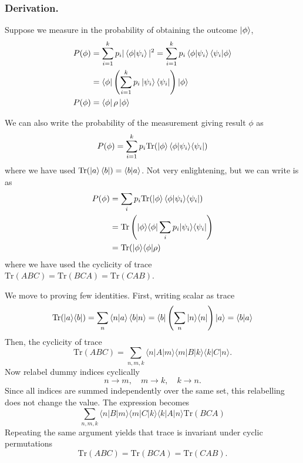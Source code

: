 \documentclass[../../../main.tex]{subfiles}
\begin{document}
\subsubsection{Derivation.}
Suppose we measure in the probability of obtaining the outcome $\ket{\phi}$,
\begin{align*}
    P(\phi)
     & =  \sum_{i=1}^{k} p_i | \braket{\phi  | \psi_i}|^2
    =  \sum_{i=1}^{k} p_i \braket{\phi|\psi_i}\braket{\psi_i|\phi}                             \\
     & = \bra{\phi} \left( \sum_{i=1}^{k} p_i \ket{\psi_i} \langle \psi_i | \right) \ket{\phi} \\
    P(\phi)
     & =  \bra{\phi}\rho \ket{\phi}
\end{align*}

We can also write the probability of the measurement giving result $\phi$ as
\begin{equation*}
    P(\phi)
    =   \sum_{i=1}^{k} p_i \mathrm{Tr} ( \ket{\phi} \langle \phi| \psi_{i} \rangle \langle \psi_{i}| )
\end{equation*}
where we have used $\mathrm{Tr} (\ket{a }\bra{b})=\braket{b  | a} $.
Not very enlightening, but we can write is as
\begin{align*}
    P(\phi)
     & = \sum_{i} p_{i} \mathrm{Tr} ( \ket{\phi} \langle \phi| \psi_{i} \rangle \langle \psi_{i}| )                \\
     & = \mathrm{Tr} \left( |\phi\rangle \langle \phi| \sum_{i} p_{i} | \psi_{i} \rangle \langle \psi_{i}| \right) \\
     & = \mathrm{Tr} ( |\phi\rangle \langle \phi| \rho )
\end{align*}
where we have used the cyclicity of trace $\mathrm{Tr}(ABC) = \mathrm{Tr}(BCA) = \mathrm{Tr}(CAB)$.

We move to proving few identities.
First, writing scalar as trace
\begin{equation*}
    \mathrm{Tr}(|a\rangle\langle b|) = \sum_{n} \braket{n  | a }\braket{b  | n}= \langle b | \left( \sum_{n} | n \rangle \langle n | \right) | a \rangle = \langle b | a \rangle
\end{equation*}
Then, the cyclicity of trace
\begin{equation*}
    \mathrm{Tr}(ABC) = \sum_{n,m,k} \langle n|A|m\rangle \langle m|B|k\rangle \langle k|C|n\rangle.
\end{equation*}
Now relabel dummy indices cyclically
\begin{equation*}
    n \rightarrow m, \quad m \rightarrow k, \quad k \rightarrow n.
\end{equation*}
Since all indices are summed independently over the same set, this relabelling does not change the value.
The expression becomes
\begin{equation*}
    \sum_{n,m,k} \langle n|B|m\rangle \langle m|C|k\rangle \langle k|A|n\rangle \mathrm{Tr}(BCA)
\end{equation*}
Repeating the same argument yields that trace is invariant under cyclic permutations
\begin{equation*}
    \mathrm{Tr}(ABC) = \mathrm{Tr}(BCA) = \mathrm{Tr}(CAB).
\end{equation*}
\end{document}

